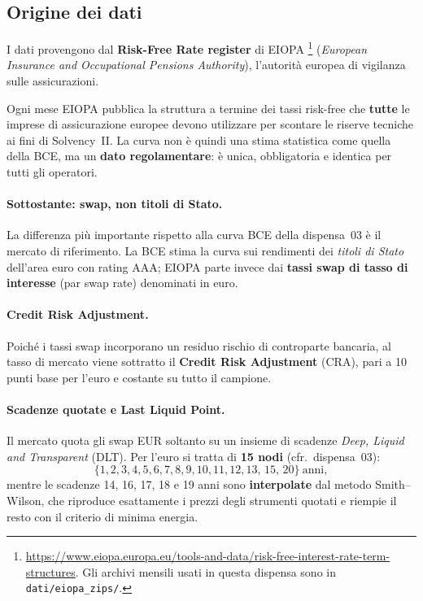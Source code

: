 \documentclass[11pt,a4paper]{article}
\newcommand{\CRA}{\ensuremath{\mathrm{CRA}}}
\theoremstyle{plain}
\theoremstyle{definition}
\theoremstyle{remark}
\begin{document}
\subsection{Origine dei dati}
\label{sec:origine-dati}

I dati provengono dal \textbf{Risk-Free Rate register} di EIOPA%
\footnote{\url{https://www.eiopa.europa.eu/tools-and-data/risk-free-interest-rate-term-structures}.
Gli archivi mensili usati in questa dispensa sono in \texttt{dati/eiopa\_zips/}.}
(\emph{European Insurance and Occupational Pensions Authority}), l'autorit\`a
europea di vigilanza sulle assicurazioni.

Ogni mese EIOPA pubblica la struttura a termine dei tassi risk-free che
\textbf{tutte} le imprese di assicurazione europee devono utilizzare per
scontare le riserve tecniche ai fini di Solvency~II. La curva non \`e quindi una
stima statistica come quella della BCE, ma un \textbf{dato regolamentare}: \`e
unica, obbligatoria e identica per tutti gli operatori.

\paragraph{Sottostante: swap, non titoli di Stato.}
La differenza pi\`u importante rispetto alla curva BCE della dispensa~03 \`e il
mercato di riferimento. La BCE stima la curva sui rendimenti dei
\emph{titoli di Stato} dell'area euro con rating AAA; EIOPA parte invece dai
\textbf{tassi swap di tasso di interesse} (par swap rate) denominati in euro.

\paragraph{Credit Risk Adjustment.}
Poich\'e i tassi swap incorporano un residuo rischio di controparte bancaria, al
tasso di mercato viene sottratto il \textbf{Credit Risk Adjustment} ($\CRA$),
pari a 10 punti base per l'euro e costante su tutto il campione.

\paragraph{Scadenze quotate e Last Liquid Point.}
Il mercato quota gli swap EUR soltanto su un insieme di scadenze
\emph{Deep, Liquid and Transparent} (DLT). Per l'euro si tratta di
\textbf{15 nodi} (cfr.\ dispensa~03):
\[
  \{1,2,3,4,5,6,7,8,9,10,11,12,13,\,15,\,20\}\ \text{anni},
\]
mentre le scadenze 14, 16, 17, 18 e 19 anni sono \textbf{interpolate} dal
metodo Smith--Wilson, che riproduce esattamente i prezzi degli strumenti
quotati e riempie il resto con il criterio di minima energia.
\end{document}
